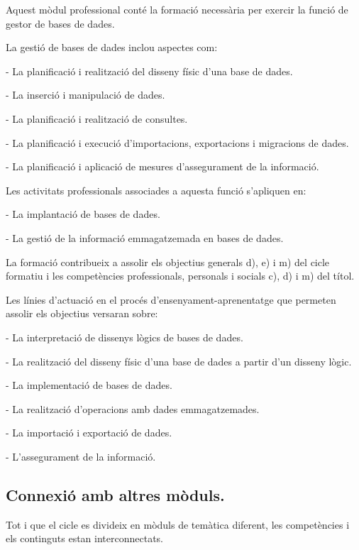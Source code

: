 \documentclass[catalan, a4paper, 12pt, titlepage]{article}
\begin{document}
Aquest mòdul professional conté la formació necessària per exercir la funció de gestor de bases de dades.

La gestió de bases de dades inclou aspectes com:

- La planificació i realització del disseny físic d'una base de dades.

- La inserció i manipulació de dades.

- La planificació i realització de consultes.

- La planificació i execució d'importacions, exportacions i migracions de dades.

- La planificació i aplicació de mesures d'assegurament de la informació.

Les activitats professionals associades a aquesta funció s'apliquen en:

- La implantació de bases de dades.

- La gestió de la informació emmagatzemada en bases de dades.

La formació contribueix a assolir els objectius generals d), e) i m) del cicle formatiu i les competències professionals, personals i socials c), d) i m) del títol.

Les línies d'actuació en el procés d'ensenyament-aprenentatge que permeten assolir els objectius versaran sobre:

- La interpretació de dissenys lògics de bases de dades.

- La realització del disseny físic d'una base de dades a partir d'un disseny lògic.

- La implementació de bases de dades.

- La realització d'operacions amb dades emmagatzemades.

- La importació i exportació de dades.

- L'assegurament de la informació.

\subsection{Connexió amb altres mòduls.}

Tot i que el cicle es divideix en mòduls de temàtica diferent, les competències i els continguts estan interconnectats.
\end{document}
